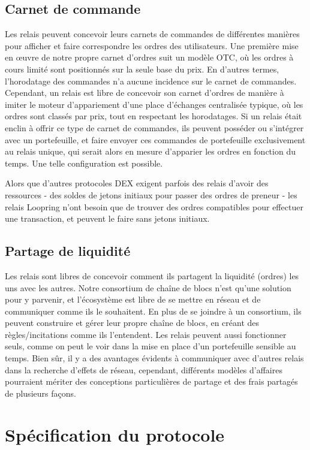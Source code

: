 \documentclass[UTF8,nofonts]{article}
\begin{document}
\begin{multicols}{2}
\subsection{Carnet de commande\label{sec:order_book}}
Les relais peuvent concevoir leurs carnets de commandes de différentes manières pour afficher et faire correspondre les ordres des utilisateurs. Une première mise en œuvre de notre propre carnet d'ordres suit un modèle OTC, où les ordres à cours limité sont positionnés sur la seule base du prix. En d'autres termes, l'horodatage des commandes n'a aucune incidence sur le carnet de commandes. Cependant, un relais est libre de concevoir son carnet d'ordres de manière à imiter le moteur d'appariement d'une place d’échanges centralisée typique, où les ordres sont classés par prix, tout en respectant les horodatages. Si un relais était enclin à offrir ce type de carnet de commandes, ils peuvent posséder ou s'intégrer avec un portefeuille, et faire envoyer ces commandes de portefeuille exclusivement au relais unique, qui serait alors en mesure d'apparier les ordres en fonction du temps. Une telle configuration est possible.

Alors que d'autres protocoles DEX exigent parfois des relais d'avoir des ressources - des soldes de jetons initiaux pour passer des ordres de preneur - les relais Loopring n'ont besoin que de trouver des ordres compatibles pour effectuer une transaction, et peuvent le faire sans jetons initiaux.

\subsection{Partage de liquidité\label{sec:liquidity_sharing}}
Les relais sont libres de concevoir comment ils partagent la liquidité (ordres) les uns avec les autres. Notre consortium de chaîne de blocs n'est qu'une solution pour y parvenir, et l'écosystème est libre de se mettre en réseau et de communiquer comme ils le souhaitent. En plus de se joindre à un consortium, ils peuvent construire et gérer leur propre chaîne de blocs, en créant des règles/incitations comme ils l'entendent. Les relais peuvent aussi fonctionner seuls, comme on peut le voir dans la mise en place d'un portefeuille sensible au temps. Bien sûr, il y a des avantages évidents à communiquer avec d'autres relais dans la recherche d'effets de réseau, cependant, différents modèles d'affaires pourraient mériter des conceptions particulières de partage et des frais partagés de plusieurs façons.

\section{Spécification du protocole\label{sec:protocol}}


\end{multicols}
\end{document}

